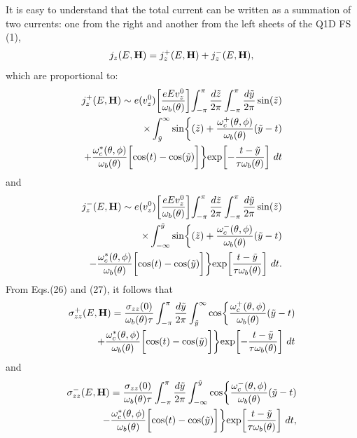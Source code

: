 \documentclass[prl,aps,showpacs,twocolumn,floatfix]{revtex4}
\begin{document}
It is easy to understand that the total current can be written as
a summation of two currents: one from the right and another from
the left sheets of the Q1D FS (1),
\begin{equation}
j_z (E,{\bf H}) = j^+_z (E,{\bf H}) + j^-_z (E,{\bf H}),
\end{equation}
which are proportional to:
\begin{eqnarray}
j^+_z(E,{\bf H}) \sim e(v^0_z)\biggl[\frac{e E v^0_z}{\omega_b
(\theta)}\biggl] \int^{\pi}_{-\pi} \frac{d \tilde z}{2 \pi}
\int^{\pi}_{-\pi} \frac{d \tilde y}{2 \pi} \sin(\tilde z)
\nonumber\\
\times \int^{\infty}_{\tilde y} \sin \biggl\{(\tilde z) +
\frac{\omega^+_c(\theta,\phi)}{\omega_b (\theta)}(\tilde y -t)
\nonumber\\
+ \frac{\omega^*_c(\theta,\phi)}{\omega_b (\theta)} \biggl[
\cos(t)-\cos(\tilde y) \biggl] \biggl\} \exp \biggl[-\frac{t-
\tilde y}{\tau \omega_b (\theta)} \biggl] \ dt
\end{eqnarray}
and
\begin{eqnarray}
j^-_z(E,{\bf H}) \sim  e(v^0_z)\biggl[\frac{e E v^0_z}{\omega_b
(\theta)}\biggl] \int^{\pi}_{-\pi} \frac{d \tilde z}{2 \pi}
\int^{\pi}_{-\pi} \frac{d \tilde y}{2 \pi} \sin(\tilde z)
\nonumber\\
\times \int^{\tilde y}_{-\infty} \sin \biggl\{(\tilde z) +
\frac{\omega^-_c(\theta,\phi)}{\omega_b (\theta)}(\tilde y -t)
\nonumber\\
- \frac{\omega^*_c(\theta,\phi)}{\omega_b (\theta)} \biggl[
\cos(t)-\cos(\tilde y) \biggl] \biggl\} \exp \biggl[\frac{t-
\tilde y}{\tau \omega_b (\theta)} \biggl] \ dt .
\end{eqnarray}
From Eqs.(26) and (27), it follows that
\begin{eqnarray}
\sigma^+_{zz}(E,{\bf H}) = \frac{\sigma_{zz}(0)}{\omega_b
(\theta)\tau } \int^{\pi}_{-\pi} \frac{d \tilde y}{2 \pi}
\int^{\infty}_{\tilde y} \cos \biggl\{
\frac{\omega^+_c(\theta,\phi)}{\omega_b (\theta)}(\tilde y -t)
\nonumber\\
+ \frac{\omega^*_c(\theta,\phi)}{\omega_b (\theta)} \biggl[
\cos(t)-\cos(\tilde y) \biggl] \biggl\} \exp \biggl[-\frac{t-
\tilde y}{\tau \omega_b (\theta)} \biggl] \ dt
\end{eqnarray}
and
\begin{eqnarray}
\sigma^-_{zz}(E,{\bf H}) = \frac{\sigma_{zz}(0)}{\omega_b
(\theta)\tau} \int^{\pi}_{-\pi} \frac{d \tilde y}{2 \pi}
\int^{\tilde y}_{-\infty} \cos \biggl\{
\frac{\omega^-_c(\theta,\phi)}{\omega_b (\theta)}(\tilde y -t)
\nonumber\\
- \frac{\omega^*_c(\theta,\phi)}{\omega_b (\theta)} \biggl[
\cos(t)-\cos(\tilde y) \biggl] \biggl\} \exp \biggl[\frac{t-
\tilde y}{\tau \omega_b (\theta)} \biggl] \ dt ,
\end{eqnarray}
\end{document}
